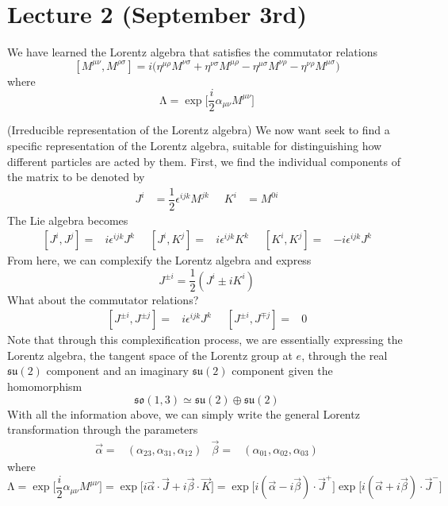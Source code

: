 \section{Lecture 2 (September 3rd)}
\begin{recall}
We have learned the Lorentz algebra that satisfies the commutator relations
	\[[M^{\mu \nu },M^{\rho \sigma }]=i\Big(\eta ^{\mu \rho }M^{\nu \sigma }+\eta ^{\nu \sigma }M^{\mu \rho }-\eta^{\mu \sigma }M^{\nu \rho }-\eta ^{\nu \rho }M^{\mu \sigma }\Big)\]
where
\[\mathrm{\Lambda }=\exp \Big[\dfrac{i}{2}\alpha _{\mu \nu }M^{\mu \nu }\Big]\]
\end{recall}
\vspace{2ex}
\begin{prop}
(Irreducible representation of the Lorentz algebra) We now want seek to find a specific representation of the Lorentz algebra, suitable for distinguishing how different particles are acted by them. First, we find the individual components of the matrix to be denoted by
\[\begin{align*}
	J^{i}&=\dfrac{1}{2}\epsilon ^{ijk}M^{jk}\; &\; K^{i}&=M^{0i}
\end{align*}\]
The Lie algebra becomes 
\[\begin{align*}
	[J^{i},J^{j}]=&i\epsilon^{ijk}J^{k}\;&\; 
	[J^{i},K^{j}]=&i\epsilon ^{ijk}K^{k}\;&\;
	[K^{i},K^{j}]=&-i\epsilon^{ijk}J^{k} 
\end{align*}\]
From here, we can complexify the Lorentz algebra and express
\[J^{\pm i}=\dfrac{1}{2}(J^{i}\pm iK^{i})\]
What about the commutator relations?
\[\begin{align*}
	[J^{\pm i},J^{\pm j}]=&i\epsilon ^{ijk}J^{k}\;&\;[J^{\pm i},J^{\mp j}]=&0
\end{align*}\]
Note that through this complexification process, we are essentially expressing the Lorentz algebra, the tangent space of the Lorentz group at $e$, through the real $\mathfrak{su}(2)$ component and an imaginary $\mathfrak{su}(2)$ component given the homomorphism 
\[\mathfrak{so}(1,3)\simeq \mathfrak{su}(2)\oplus \mathfrak{su}(2)\]	
With all the information above, we can simply write the general Lorentz transformation through the parameters
\[\begin{align*}
	\vec{\alpha }=&(\alpha_{23},\alpha _{31},\alpha _{12})&\vec{\beta }=&(\alpha _{01},\alpha _{02},\alpha _{03})
\end{align*}\]
where
	\[\mathrm{\Lambda }=\exp \Big[\dfrac{i}{2}\alpha _{\mu \nu }M^{\mu \nu }\Big]=\exp \Big[i\vec{\alpha }\cdot \vec{J}+i\vec{\beta }\cdot \vec{K}\Big]=\exp \Big[i(\vec{\alpha }-i\vec{\beta })\cdot \vec{J}^{+}\Big]\exp \Big[i(\vec{\alpha }+i\vec{\beta })\cdot \vec{J}^{-}\Big]\]
\end{prop}
